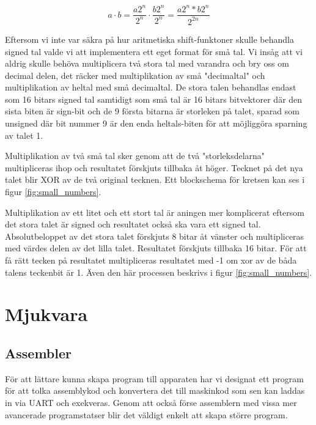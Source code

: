 \documentclass[a4paper]{article}
\begin{document}
    \begin{equation}
        \label{eq:mult_shift}
        a \cdot b = \frac{a 2^n}{2^n} \cdot \frac{b 2^n}{2^n} = \frac{a2^n *
        b2^n}{2^{2n}}
    \end{equation}

    Eftersom vi inte var säkra på hur aritmetiska shift-funktoner skulle
    behandla signed tal valde vi att implementera ett eget format för små tal.
    Vi insåg att vi aldrig skulle behöva multiplicera två stora tal med varandra
    och bry oss om decimal delen, det räcker med multiplikation av små
    "decimaltal" och multiplikation av heltal med små decimaltal. De stora talen
    behandlas endast som 16 bitars signed tal samtidigt som små tal är 16 bitars
    bitvektorer där den sista biten är sign-bit och de 9 första bitarna är
    storleken på talet, sparad som unsigned där bit nummer 9 är den enda heltals-biten
    för att möjliggöra sparning av talet 1. 

    Multiplikation av två små tal sker genom att de två "storleksdelarna"
    multipliceras ihop och resultatet förskjuts tillbaka åt höger. Tecknet på
    det nya talet blir XOR av de två original tecknen. Ett blockschema för
    kretsen kan ses i figur \ref{fig:small_numbers}.

    Multiplikation av ett litet och ett stort tal är aningen mer komplicerat
    eftersom det stora talet är signed och resultatet också ska vara ett
    signed tal. Absolutbeloppet av det stora talet förskjuts 8 bitar åt vänster
    och multipliceras med värdes delen av det lilla talet. Resultatet förskjuts
    tillbaka 16 bitar. För att få rätt tecken på resultatet multipliceras
    resultatet med -1 om xor av de båda talens teckenbit är 1. Även den här
    processen beskrivs i figur \ref{fig:small_numbers}.


    \section{Mjukvara}
    \subsection{Assembler}

    För att lättare kunna skapa program till apparaten har vi designat ett program
    för att tolka assemblykod och konvertera det till maskinkod som sen kan laddas
    in via UART och exekveras. Genom att också förse assemblern med vissa mer
    avancerade programstatser blir det väldigt enkelt att skapa större program. 
\end{document}
